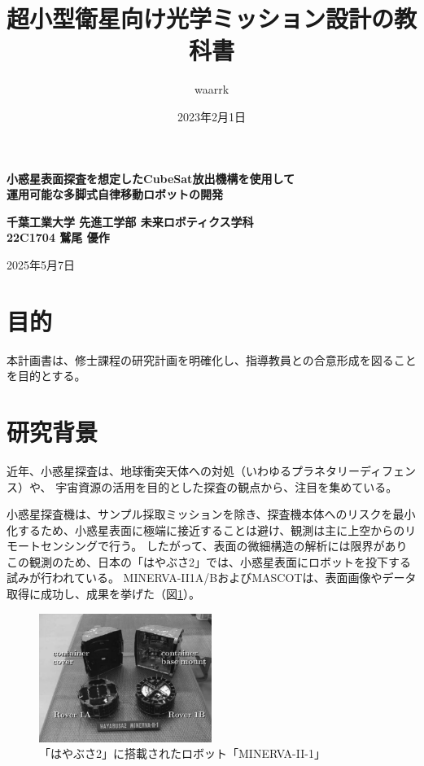 \documentclass[dvipdfmx,titlepage,a4j]{jsarticle}
\title{超小型衛星向け光学ミッション設計の教科書}
\author{waarrk}
\date{2023年2月1日}
\begin{document}
\begin{titlepage}
    \centering
    \vspace*{2cm}

    \vspace{5cm}

    {\LARGE \textbf{小惑星表面探査を想定したCubeSat放出機構を使用して\\運用可能な多脚式自律移動ロボットの開発}}

    \vspace{0.5cm}

    {\textbf{千葉工業大学 先進工学部 未来ロボティクス学科}\\}
    {\textbf{22C1704 鷲尾 優作}}

    \vfill

    {\large 2025年5月7日}

    \vspace{1cm}
\end{titlepage}

\newpage

\section{目的}
本計画書は、修士課程の研究計画を明確化し、指導教員との合意形成を図ることを目的とする。

\section{研究背景}
近年、小惑星探査は、地球衝突天体への対処（いわゆるプラネタリーディフェンス）や、
宇宙資源の活用を目的とした探査の観点から、注目を集めている。

小惑星探査機は、サンプル採取ミッションを除き、探査機本体へのリスクを最小化するため、小惑星表面に極端に接近することは避け、観測は主に上空からのリモートセンシングで行う。
したがって、表面の微細構造の解析には限界がありこの観測のため、日本の「はやぶさ2」では、小惑星表面にロボットを投下する試みが行われている。
MINERVA-II1A/B\cite{minelva:online}およびMASCOT\cite{Krause2022}は、表面画像やデータ取得に成功し、成果を挙げた（図\ref{fig:hayabusa2}）。

\begin{figure}[H]
    \centering
    \includegraphics[width=0.5\textwidth]{picture/mine.png}
    \caption{「はやぶさ2」に搭載されたロボット「MINERVA-II-1」}
    \label{fig:hayabusa2}
\end{figure}
\end{document}
